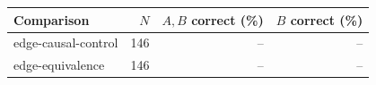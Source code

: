 \begin{tabular}{lrrr}
\toprule
Comparison & $N$ & $A,B$ correct (\%) & $B$ correct (\%) \\
\midrule
edge-causal-control & 146 & -- & -- \\
edge-equivalence & 146 & -- & -- \\
\bottomrule
\end{tabular}

